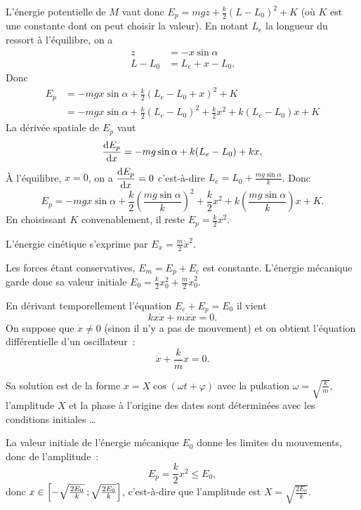 L'énergie potentielle de \(M\) vaut donc \(E_p = mgz + \frac{k}{2}(L-L_0)^2 +K\) (où \(K\) est une constante dont on peut choisir la valeur). En notant \(L_e\) la longueur du ressort à l'équilibre, on a
\begin{align}
  z &= -x \sin \alpha \\
  L-L_0 &= L_e+x-L_0.
\end{align}
Donc
\begin{align}
  E_p &= -mgx \sin \alpha + \frac{k}{2}(L_e-L_0+x)^2 +K \\
  &= -mgx \sin \alpha + \frac{k}{2}(L_e-L_0)^2 +\frac{k}{2}x^2 + k(L_e-L_0)x+K 
\end{align}
La dérivée spatiale de \(E_p\) vaut
\begin{equation}
  \dfrac{\mathrm{d} E_p}{\mathrm{d} x} = -mg\sin\alpha + k(L_e-L_0) + kx.
\end{equation}
À l'équilibre, \(x=0\), on a \(\dfrac{\mathrm{d} E_p}{\mathrm{d} x}=0\) c'est-à-dire \(L_e = L_0 + \frac{mg\sin\alpha}{k}\). Donc
\begin{equation}
  E_p = -mgx \sin \alpha + \frac{k}{2}\left(\frac{mg\sin\alpha}{k}\right)^2 +\frac{k}{2}x^2 + k\left(\frac{mg\sin\alpha}{k}\right)x+K.
\end{equation}
En choisissant \(K\) convenablement, il reste \(E_p = \frac{k}{2}x^2\).

L'énergie cinétique s'exprime par \(E_x = \frac{m}{2} \dot{x}^2\).

Les forces étant conservatives, \(E_m=E_p+E_c\) est constante. L'énergie mécanique garde donc sa valeur initiale \(E_0=\frac{k}{2}x_0^2 + \frac{m}{2}\dot{x}_0^2\).

En dérivant temporellement l'équation \(E_c+E_p=E_0\) il vient
\begin{equation}
  k x \dot{x} +m \dot{x}\ddot{x} =0.
\end{equation}
On suppose que \(\dot{x} \neq 0\) (sinon il n'y a pas de mouvement) et on obtient l'équation différentielle d'un oscillateur~:
\begin{equation}
  \ddot{x} + \frac{k}{m}x=0.
\end{equation}

Sa solution est de la forme \(x=X\cos(\omega t +\varphi)\) avec la pulsation \(\omega = \sqrt{\frac{k}{m}}\), l'amplitude \(X\) et la phase à l'origine des dates sont déterminées avec les conditions initiales \ldots

La valeur initiale de l'énergie mécanique \(E_0\) donne les limites du mouvements, donc de l'amplitude~:
\begin{equation}
  E_p=\frac{k}{2}x^2 \leq E_0,
\end{equation}
donc \(x \in \left[ -\sqrt{\frac{2E_0}{k}} \, ;  \sqrt{\frac{2E_0}{k}} \right]\), c'est-à-dire que l'amplitude est \(X=\sqrt{\frac{2E_0}{k}}\).

